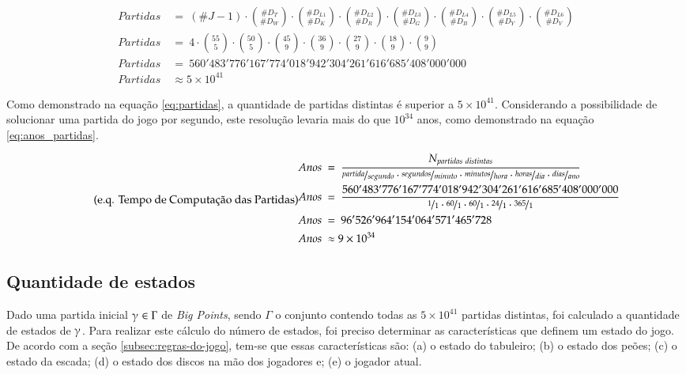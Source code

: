  \begin{equation}
	 \label{eq:partidas}
	 \tag{e.q. Quantidades de Partidas Distintas}
 \begin{split}
 Partidas\ &=\  (\#J-1) \cdot \binom{\#D_T}{\#D_W} \cdot \binom{\#D_{L1}}{\#D_K} \cdot \binom{\#D_{L2}}{\#D_R} \cdot \binom{\#D_{L3}}{\#D_G} \cdot \binom{\#D_{L4}}{\#D_B} \cdot \binom{\#D_{L5}}{\#D_Y} \cdot \binom{\#D_{L6}}{\#D_V}\\
 Partidas\ &=\  4\cdot \binom{55}{5} \cdot \binom{50}{5} \cdot \binom{45}{9} \cdot \binom{36}{9} \cdot \binom{27}{9} \cdot \binom{18}{9} \cdot \binom{9}{9}\\
 Partidas\ &=\ 560'483'776'167'774'018'942'304'261'616'685'408'000'000\\
 Partidas\ &\approx 5\times 10^{41}
 \end{split}
 \end{equation}

Como demonstrado na equação \ref{eq:partidas}, a quantidade de partidas distintas é superior a $5\times 10^{41}$. Considerando a possibilidade de solucionar uma partida do jogo por segundo, este resolução levaria mais do que $10^{34}$ anos, como demonstrado na equação \ref{eq:anos_partidas}.

 \begin{equation} \label{eq:anos_partidas} \tag{e.q. Tempo de Computação das Partidas}
 \begin{split}
 Anos\ &=\ \dfrac{N_{partidas\ distintas}}{\nicefrac{partida}{segundo}\cdot\nicefrac{segundos}{minuto}\cdot\nicefrac{minutos}{hora}\cdot\nicefrac{horas}{dia}\cdot\nicefrac{dias}{ano}}\\
 Anos\ &=\ \dfrac{560'483'776'167'774'018'942'304'261'616'685'408'000'000}{\nicefrac{1}{1}\cdot\nicefrac{60}{1}\cdot\nicefrac{60}{1}\cdot\nicefrac{24}{1}\cdot\nicefrac{365}{1}}\\
 Anos\ &=\ 96'526'964'154'064'571'465'728\\
 Anos\ &\approx 9\times 10^{34}
 \end{split}
 \end{equation}

\subsection{Quantidade de estados}

Dado uma partida inicial $\gammaup \in \Gamma$ de \emph{Big Points}, sendo $\Gamma$ o conjunto contendo todas as $5\times 10^{41}$ partidas distintas, foi calculado a quantidade de estados de $\gammaup$. Para realizar este cálculo do número de estados, foi preciso determinar as características que definem um estado do jogo. De acordo com a seção \ref{subsec:regras-do-jogo}, tem-se que essas características são: (a) o estado do tabuleiro; (b) o estado dos peões; (c) o estado da escada; (d) o estado dos discos na mão dos jogadores e; (e) o jogador atual.


